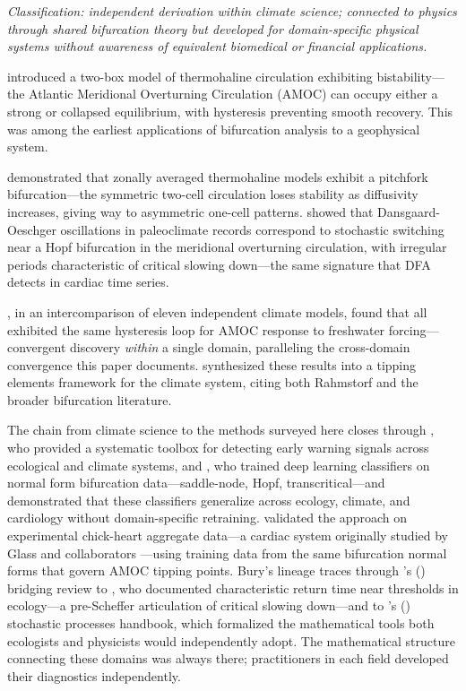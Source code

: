 \documentclass[11pt]{article}
\begin{document}
\noindent\textit{Classification: independent derivation within climate science; connected to physics through shared bifurcation theory but developed for domain-specific physical systems without awareness of equivalent biomedical or financial applications.}
\smallskip

\citet{stommel1961} introduced a two-box model of thermohaline circulation exhibiting bistability---the Atlantic Meridional Overturning Circulation (AMOC) can occupy either a strong or collapsed equilibrium, with hysteresis preventing smooth recovery. This was among the earliest applications of bifurcation analysis to a geophysical system.

\citet{schmidt_mysak1996} demonstrated that zonally averaged thermohaline models exhibit a pitchfork bifurcation---the symmetric two-cell circulation loses stability as diffusivity increases, giving way to asymmetric one-cell patterns. \citet{wang_mysak2006} showed that Dansgaard-Oeschger oscillations in paleoclimate records correspond to stochastic switching near a Hopf bifurcation in the meridional overturning circulation, with irregular periods characteristic of critical slowing down---the same signature that DFA detects in cardiac time series.

\citet{rahmstorf2005}, in an intercomparison of eleven independent climate models, found that all exhibited the same hysteresis loop for AMOC response to freshwater forcing---convergent discovery \textit{within} a single domain, paralleling the cross-domain convergence this paper documents. \citet{lenton2008} synthesized these results into a tipping elements framework for the climate system, citing both Rahmstorf and the broader bifurcation literature.

The chain from climate science to the methods surveyed here closes through \citet{dakos2012}, who provided a systematic toolbox for detecting early warning signals across ecological and climate systems, and \citet{bury2021}, who trained deep learning classifiers on normal form bifurcation data---saddle-node, Hopf, transcritical---and demonstrated that these classifiers generalize across ecology, climate, and cardiology without domain-specific retraining. \citet{bury2023} validated the approach on experimental chick-heart aggregate data---a cardiac system originally studied by Glass and collaborators \citep{mackey_glass1977}---using training data from the same bifurcation normal forms that govern AMOC tipping points. Bury's lineage traces through \citeauthor{scheffer2009}'s (\citeyear{scheffer2009}) bridging review to \citet{wissel1984}, who documented characteristic return time near thresholds in ecology---a pre-Scheffer articulation of critical slowing down---and to \citeauthor{gardiner1983}'s (\citeyear{gardiner1983}) stochastic processes handbook, which formalized the mathematical tools both ecologists and physicists would independently adopt. The mathematical structure connecting these domains was always there; practitioners in each field developed their diagnostics independently.
\end{document}
